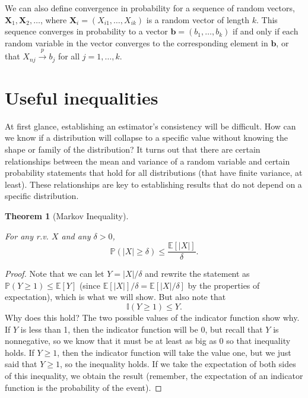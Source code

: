 \documentclass[
  letterpaper,
  DIV=11,
  numbers=noendperiod]{scrreprt}
\newcommand{\mb}{\symbf}
\newcommand{\E}{\mathbb{E}}
\renewcommand{\P}{\mathbb{P}}
\newcommand{\X}{\mb{X}}
\newcommand{\inprob}{\overset{p}{\to}}
\theoremstyle{definition}
\theoremstyle{definition}
\theoremstyle{plain}
\newtheorem{theorem}{Theorem}[chapter]
\theoremstyle{remark}
\begin{document}
We can also define convergence in probability for a sequence of random
vectors, \(\X_1, \X_2, \ldots\), where
\(\X_i = (X_{i1}, \ldots, X_{ik})\) is a random vector of length \(k\).
This sequence converges in probability to a vector
\(\mb{b} = (b_1, \ldots, b_k)\) if and only if each random variable in
the vector converges to the corresponding element in \(\mb{b}\), or that
\(X_{nj} \inprob b_j\) for all \(j = 1, \ldots, k\).

\hypertarget{useful-inequalities}{%
\section{Useful inequalities}\label{useful-inequalities}}

At first glance, establishing an estimator's consistency will be
difficult. How can we know if a distribution will collapse to a specific
value without knowing the shape or family of the distribution? It turns
out that there are certain relationships between the mean and variance
of a random variable and certain probability statements that hold for
all distributions (that have finite variance, at least). These
relationships are key to establishing results that do not depend on a
specific distribution.

\begin{theorem}[Markov
Inequality]\protect\hypertarget{thm-markov}{}\label{thm-markov}

For any r.v. \(X\) and any \(\delta >0\), \[
\P(|X| \geq \delta) \leq \frac{\E[|X|]}{\delta}.
\]

\end{theorem}

\begin{proof}

Note that we can let \(Y = |X|/\delta\) and rewrite the statement as
\(\P(Y \geq 1) \leq \E[Y]\) (since \(\E[|X|]/\delta = \E[|X|/\delta]\)
by the properties of expectation), which is what we will show. But also
note that \[
\mathbb{I}(Y \geq 1) \leq Y.
\] Why does this hold? The two possible values of the indicator function
show why. If \(Y\) is less than 1, then the indicator function will be
0, but recall that \(Y\) is nonnegative, so we know that it must be at
least as big as 0 so that inequality holds. If \(Y \geq 1\), then the
indicator function will take the value one, but we just said that
\(Y \geq 1\), so the inequality holds. If we take the expectation of
both sides of this inequality, we obtain the result (remember, the
expectation of an indicator function is the probability of the event).

\end{proof}
\end{document}
